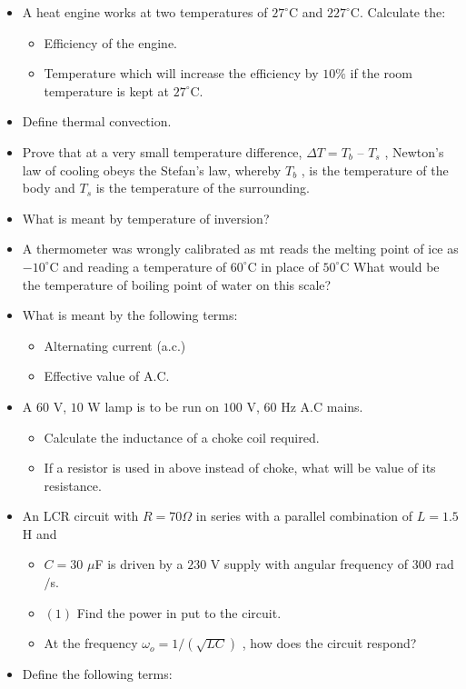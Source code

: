\documentclass{article}
\begin{document}
\begin{itemize}
\item A heat engine works at two temperatures of $ 27^{\circ}$C and $ 227^{\circ}$C. Calculate the:
 \begin{itemize}
\item Efficiency of the engine. 
\item Temperature which will increase the efficiency by $ 10\%$ if the room temperature is kept at $ 27^{\circ}$C. 
\end{itemize}
\item Define thermal convection.
\item Prove that at a very small temperature difference, $ \Delta T=T_{b}$ – $ T_{s}$ ,  Newton's law of cooling obeys the Stefan’s law, whereby $ T_{b}$ , is the temperature of the body and $ T_{s}$ is the temperature of the surrounding. 
\item What is meant by temperature of inversion?
\item A thermometer was wrongly calibrated as mt reads the melting point of ice as $ -10^{\circ}$C and reading a temperature of $ 60^{\circ}$C in place of $ 50^{\circ}$C What would be the temperature of boiling point of water on this scale? 
\item What is meant by the following terms:
 \begin{itemize}
\item Alternating current (a.c.)
\item Effective value of A.C. 
\end{itemize}
\item A $ 60$ V, $ 10$ W lamp is to be run on $ 100$ V, $ 60$ Hz A.C mains.
 \begin{itemize}
\item Calculate the inductance of a choke coil required.
\item If a resistor is used in above instead of choke, what will be value of its resistance.
\end{itemize}
\item An LCR circuit with $ R=70\Omega$ in series with a parallel combination of $ L=1.5$ H and
 \begin{itemize}
\item $ C=30$ $\mu$F is driven by a $ 230$ V supply with angular frequency of $ 300$ rad$/$s.
\item $ (1)$ Find the power in put to the circuit. 
\item  At the frequency $ \omega_{o}=1/(\sqrt{LC})$ , how does the circuit respond?
\end{itemize}
\item Define the following terms:

\end{itemize}
\end{document}
